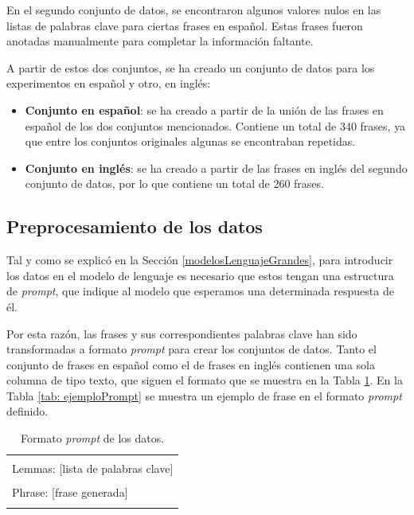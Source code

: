 \documentclass[11pt,spanish,listoffigures,listoftables]{tfgetsinf}
\begin{document}
En el segundo conjunto de datos, se encontraron algunos valores nulos en las listas de palabras clave para ciertas frases en español. Estas frases fueron anotadas manualmente para completar la información faltante.

A partir de estos dos conjuntos, se ha creado un conjunto de datos para los experimentos en español y otro, en inglés:

\begin{itemize}
	\item \textbf{Conjunto en español}: se ha creado a partir de la unión de las frases en español de los dos conjuntos mencionados. Contiene un total de 340 frases, ya que entre los conjuntos originales algunas se encontraban repetidas.
	\item \textbf {Conjunto en inglés}: se ha creado a partir de las frases en inglés del segundo conjunto de datos, por lo que contiene un total de 260 frases.
\end{itemize}

\subsection{Preprocesamiento de los datos}

Tal y como se explicó en la Sección \ref{modelosLenguajeGrandes}, para introducir los datos en el modelo de lenguaje es necesario que estos tengan una estructura de \textit{prompt}, que indique al modelo que esperamos una determinada respuesta de él.

Por esta razón, las frases y sus correspondientes palabras clave han sido transformadas a formato \textit{prompt} para crear los conjuntos de datos. Tanto el conjunto de frases en español como el de frases en inglés contienen una sola columna de tipo texto, que siguen el formato que se muestra en la Tabla \ref{tab: formatoPrompt}. En la Tabla \ref{tab: ejemploPrompt} se muestra un ejemplo de frase en el formato \textit{prompt} definido.

\begin{table}[!h]
\caption{Formato \textit{prompt} de los datos.}
\begin{center}
\begin{tabular}{ | l | }
\hline
	\\
	Lemmas: [lista de palabras clave] \\
	\\
	Phrase: [frase generada] \\
	\\
\hline
\end{tabular}
\end{center}
\label{tab: formatoPrompt}
\end{table}
\end{document}
